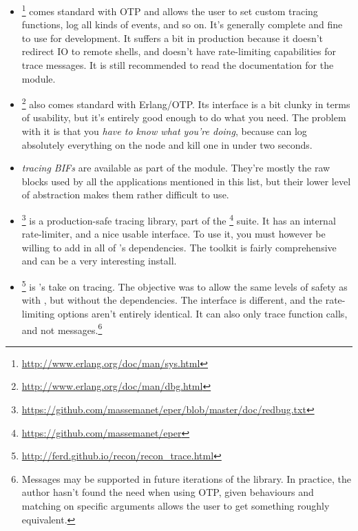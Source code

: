 \documentclass[11pt, oneside]{book}   	%
\begin{document}
\begin{itemize}
	\item {}\footnote{\href{http://www.erlang.org/doc/man/sys.html}{http://www.erlang.org/doc/man/sys.html}} comes standard with OTP and allows the user to set custom tracing functions, log all kinds of events, and so on. It's generally complete and fine to use for development. It suffers a bit in production because it doesn't redirect IO to remote shells, and doesn't have rate-limiting capabilities for trace messages. It is still recommended to read the documentation for the module.
	
	\item {}\footnote{\href{http://www.erlang.org/doc/man/dbg.html}{http://www.erlang.org/doc/man/dbg.html}} also comes standard with Erlang/OTP. Its interface is a bit clunky in terms of usability, but it's entirely good enough to do what you need. The problem with it is that you \emph{have to know what you're doing}, because  can log absolutely everything on the node and kill one in under two seconds.
	
	\item \emph{tracing BIFs} are available as part of the  module. They're mostly the raw blocks used by all the applications mentioned in this list, but their lower level of abstraction makes them rather difficult to use.
	
	\item {}\footnote{\href{https://github.com/massemanet/eper/blob/master/doc/redbug.txt}{https://github.com/massemanet/eper/blob/master/doc/redbug.txt}} is a production-safe tracing library, part of the \footnote{\href{https://github.com/massemanet/eper}{https://github.com/massemanet/eper}} suite. It has an internal rate-limiter, and a nice usable interface. To use it, you must however be willing to add in all of 's dependencies. The toolkit is fairly comprehensive and can be a very interesting install.
	
	\item {}\footnote{\href{http://ferd.github.io/recon/recon\_trace.html}{http://ferd.github.io/recon/recon\_trace.html}} is 's take on tracing. The objective was to allow the same levels of safety as with , but without the dependencies. The interface is different, and the rate-limiting options aren't entirely identical. It can also only trace function calls, and not messages.\footnote{Messages may be supported in future iterations of the library. In practice, the author hasn't found the need when using OTP, given behaviours and matching on specific arguments allows the user to get something roughly equivalent.}
\end{itemize}
\end{document}
